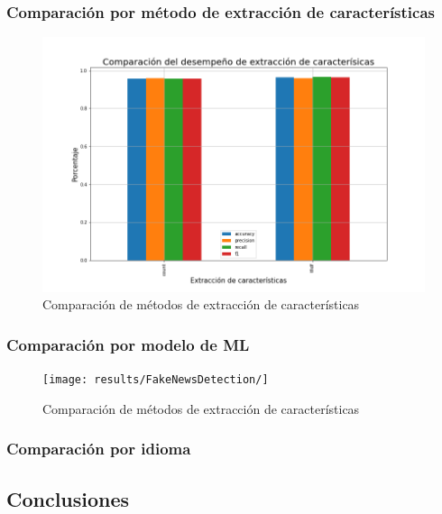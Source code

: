\subsubsection{Comparación por método de extracción de características}
\begin{figure}
    \centering
    \includegraphics[width=\textwidth]{results/FakeNewsDetection/feature_extraction_comparison.png}
    \caption{Comparación de métodos de extracción de características}
    \label{fig:fake_news_feature_extraction}
\end{figure}

\subsubsection{Comparación por modelo de ML}
\begin{figure}
    \centering
    \texttt{[image: results/FakeNewsDetection/]}
    \caption{Comparación de métodos de extracción de características}
    \label{fig:fake_news_feature_extraction}
\end{figure}

\subsubsection{Comparación por idioma}


\subsection{Conclusiones}

